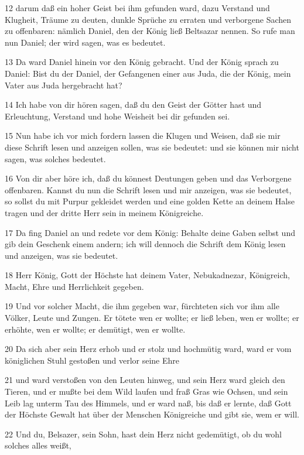 \par 12 darum daß ein hoher Geist bei ihm gefunden ward, dazu Verstand und Klugheit, Träume zu deuten, dunkle Sprüche zu erraten und verborgene Sachen zu offenbaren: nämlich Daniel, den der König ließ Beltsazar nennen. So rufe man nun Daniel; der wird sagen, was es bedeutet.
\par 13 Da ward Daniel hinein vor den König gebracht. Und der König sprach zu Daniel: Bist du der Daniel, der Gefangenen einer aus Juda, die der König, mein Vater aus Juda hergebracht hat?
\par 14 Ich habe von dir hören sagen, daß du den Geist der Götter hast und Erleuchtung, Verstand und hohe Weisheit bei dir gefunden sei.
\par 15 Nun habe ich vor mich fordern lassen die Klugen und Weisen, daß sie mir diese Schrift lesen und anzeigen sollen, was sie bedeutet: und sie können mir nicht sagen, was solches bedeutet.
\par 16 Von dir aber höre ich, daß du könnest Deutungen geben und das Verborgene offenbaren. Kannst du nun die Schrift lesen und mir anzeigen, was sie bedeutet, so sollst du mit Purpur gekleidet werden und eine golden Kette an deinem Halse tragen und der dritte Herr sein in meinem Königreiche.
\par 17 Da fing Daniel an und redete vor dem König: Behalte deine Gaben selbst und gib dein Geschenk einem andern; ich will dennoch die Schrift dem König lesen und anzeigen, was sie bedeutet.
\par 18 Herr König, Gott der Höchste hat deinem Vater, Nebukadnezar, Königreich, Macht, Ehre und Herrlichkeit gegeben.
\par 19 Und vor solcher Macht, die ihm gegeben war, fürchteten sich vor ihm alle Völker, Leute und Zungen. Er tötete wen er wollte; er ließ leben, wen er wollte; er erhöhte, wen er wollte; er demütigt, wen er wollte.
\par 20 Da sich aber sein Herz erhob und er stolz und hochmütig ward, ward er vom königlichen Stuhl gestoßen und verlor seine Ehre
\par 21 und ward verstoßen von den Leuten hinweg, und sein Herz ward gleich den Tieren, und er mußte bei dem Wild laufen und fraß Gras wie Ochsen, und sein Leib lag unterm Tau des Himmels, und er ward naß, bis daß er lernte, daß Gott der Höchste Gewalt hat über der Menschen Königreiche und gibt sie, wem er will.
\par 22 Und du, Belsazer, sein Sohn, hast dein Herz nicht gedemütigt, ob du wohl solches alles weißt,
